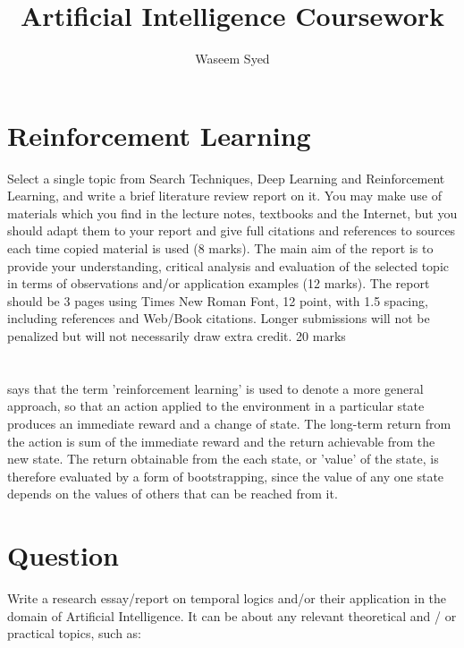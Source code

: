\documentclass[12pt,a4paper]{article}
\author{Waseem Syed}
\title{Artificial Intelligence Coursework}
\date{}
\begin{document}
	\maketitle
	
	
	\section{Reinforcement Learning}
	
	{
	Select a single topic from Search Techniques, Deep Learning and Reinforcement Learning, and write a brief literature review report on it.  You may make use of materials which you find in the lecture notes, textbooks and the Internet, but you should adapt them to your report and give full citations and references to sources each time copied material is used (8 marks).  The main aim of the report is to provide your understanding, critical analysis and evaluation of the selected topic in terms of observations and/or application examples (12 marks). The report should be 3 pages using Times New Roman Font, 12 point, with 1.5 spacing, including references and Web/Book citations. Longer submissions will not be penalized but will not necessarily draw extra credit. {20 marks}\\
	\\
	\\
	

\cite{sutton2011reinforcement} says that the term 'reinforcement learning' is used to denote a more general approach, so that an action applied to the environment in a particular state produces an immediate reward and a change of state. The long-term return from the action is sum of the immediate reward and the return achievable from the new state. The return obtainable from the each state, or 'value' of the state, is therefore evaluated by a form of bootstrapping, since the value of any one state depends on the values of others that can be reached from it.
	
}
	
		
	
	
	
	\section{Question}
	Write a research essay/report on temporal logics and/or their application in the domain of Artificial Intelligence. It can be about any relevant theoretical and / or practical topics, such as:
	
\end{document}
